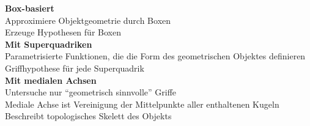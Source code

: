 \textbf{Box-basiert}\\
Approximiere Objektgeometrie durch Boxen\\
Erzeuge Hypothesen für Boxen\\

\textbf{Mit Superquadriken}\\
Parametrisierte Funktionen, die die Form des geometrischen Objektes definieren\\
Griffhypothese für jede Superquadrik\\

\textbf{Mit medialen Achsen}\\
Untersuche nur \enquote{geometrisch sinnvolle} Griffe\\
Mediale Achse ist Vereinigung der Mittelpunkte aller enthaltenen Kugeln\\
Beschreibt topologisches Skelett des Objekts\\



